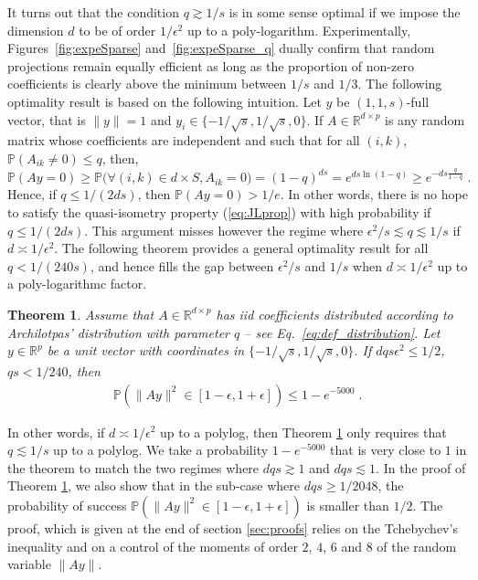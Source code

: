\documentclass{ps}
\def\R{\mathbb{R}}
\renewcommand{\P}{\mathbb{P}}
\newcommand{\1}{\mathbbm{1}}
\theoremstyle{plain}
\newtheorem{theorem}{Theorem}
\begin{document}
It turns out that the condition $q \gtrsim 1/s$ is  in some sense optimal if we impose the dimension $d$ to be of order $1/\epsilon^2$ up to a poly-logarithm. 
Experimentally, Figures~\ref{fig:expeSparse} and~\ref{fig:expeSparse_q} dually confirm that random projections remain equally efficient as long as the proportion of non-zero coefficients is clearly above the minimum between $1/s$ and $1/3$. 
The following optimality result is based on the following intuition. Let $y$ be $(1,1,s)$-full vector, that is $\|y\|=1$ and $y_i\in \{-1/\sqrt{s}, 1/\sqrt{s}, 0\}$. If $A \in \R^{d\times p}$ is any random matrix whose coefficients are independent and such that for all $(i,k) $, $\P(A_{ik}\neq 0) \leq q$, then,
\[
	\P(Ay = 0) \geq \P\Big(\forall (i,k) \in d\times S, A_{ik}=0\Big) 
	= (1-q)^{ds} 
	= e^{ds\ln(1-q)}
	\geq e^{-ds\tfrac{q}{1-q}} \; .
\]
Hence, if $q \leq 1/(2ds)$, then $\P(Ay = 0) > 1/e$. In other words, there is no hope to satisfy the quasi-isometry property (\ref{eq:JLprop}) with high probability if $q \leq 1/(2ds)$. This argument misses however the regime where $\epsilon^2/s \lesssim q \lesssim 1/s$ if $d \asymp 1/\epsilon^2$. The following theorem provides a general optimality result for all $q < 1/(240s)$, and hence fills the gap between $\epsilon^2/s$ and $1/s$ when $d \asymp 1/\epsilon^2$ up to a poly-logarithmc factor.

\begin{theorem}\label{th:optimality}
	Assume that $A \in \R^{d \times p}$ has iid coefficients distributed according to Archilotpas' distribution with parameter $q$ -- see Eq.~\eqref{eq:def_distribution}. Let $y \in \R^p$ be a unit vector with coordinates in $\{-1/\sqrt{s}, 1/\sqrt{s}, 0\}$. If $dqs \epsilon^2 \leq 1/2$, $qs < 1/240$, then 
		\begin{align*}
			\P(\|Ay\|^2 \in [1-\epsilon, 1+\epsilon]) \leq 1- e^{-5000}\; .
		\end{align*}
\end{theorem}

In other words, if $d \asymp 1/\epsilon^2$ up to a polylog, then Theorem \ref{th:optimality} only requires that $q \lesssim 1/s$ up to a polylog. We take a probability $1- e^{-5000}$ that is very close to $1$ in the theorem to match the two regimes where $dqs \gtrsim 1$ and $dqs \lesssim 1$. In the proof of  Theorem \ref{th:optimality}, we also show that in the sub-case where $dqs \geq 1/2048$, the probability of success $\P(\|Ay\|^2 \in [1-\epsilon, 1+\epsilon])$ is smaller than $1/2$.
The proof, which is given at the end of section \ref{sec:proofs} relies on the Tchebychev's inequality and on a control of the moments of order $2$, $4$, $6$ and $8$ of the random variable $\|Ay\|$.
\end{document}
